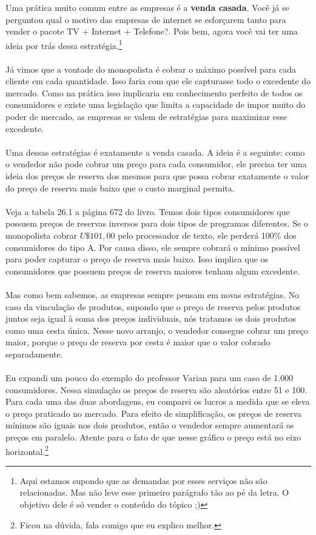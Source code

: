 \documentclass[a4paper,11pt,oneside]{book}
\theoremstyle{definition}
\theoremstyle{break}
\begin{document}
Uma prática muito comum entre as empresas é a \textbf{venda casada}. Você já se perguntou qual o motivo das empresas de internet se esforçarem tanto para vender o pacote TV + Internet + Telefone?. Pois bem, agora você vai ter uma ideia por trás dessa estratégia.\footnote{Aqui estamos supondo que as demandas por esses serviços não são relacionadas. Mas não leve esse primeiro parágrafo tão ao pé da letra. O objetivo dele é só vender o conteúdo do tópico ;)}
\\~\\
Já vimos que a vontade do monopolista é cobrar o máximo possível para cada cliente em cada quantidade. Isso faria com que ele capturasse todo o excedente do mercado. Como na prática isso implicaria em conhecimento perfeito de todos os consumidores e existe uma legislação que limita a capacidade de impor muito do poder de mercado, as empresas se valem de estratégias para maximizar esse excedente.
\\~\\
Uma dessas estratégias é exatamente a venda casada. A ideia é a seguinte: como o vendedor não pode cobrar um preço para cada consumidor, ele precisa ter uma ideia dos preços de reserva dos mesmos para que possa cobrar exatamente o valor do preço de reserva mais baixo que o custo marginal permita.
\\~\\
Veja a tabela 26.1 a página 672 do livro. Temos dois tipos consumidores que possuem preços de reservas inversos para dois tipos de programas diferentes. Se o monopolista cobrar $U\$ 101,00$ pelo processador de texto, ele perderá 100\% dos consumidores do tipo A. Por causa disso, ele sempre cobrará o mínimo possível para poder capturar o preço de reserva mais baixo. Isso implica que os consumidores que possuem preços de reserva maiores tenham algum excedente.
\\~\\
Mas como bem sabemos, as empresas sempre pensam em novas estratégias. No caso da vinculação de produtos, supondo que o preço de reserva pelos produtos juntos seja igual à soma dos preços individuais, nós tratamos os dois produtos como uma cesta única. Nesse novo arranjo, o vendedor consegue cobrar um preço maior, porque o preço de reserva por cesta é maior que o valor cobrado separadamente.
\\~\\
Eu expandi um pouco do exemplo do professor Varian para um caso de 1.000 consumidores. Nessa simulação os preços de reserva são aleatórios entre 51 e 100. Para cada uma das duas abordagens, eu comparei os lucros a medida que se eleva o preço praticado no mercado. Para efeito de simplificação, os preços de reserva mínimos são iguais nos dois produtos, então o vendedor sempre aumentará os preços em paralelo. Atente para o fato de que nesse gráfico o preço está no eixo horizontal.\footnote{Ficou na dúvida, fala comigo que eu explico melhor.}
\end{document}
